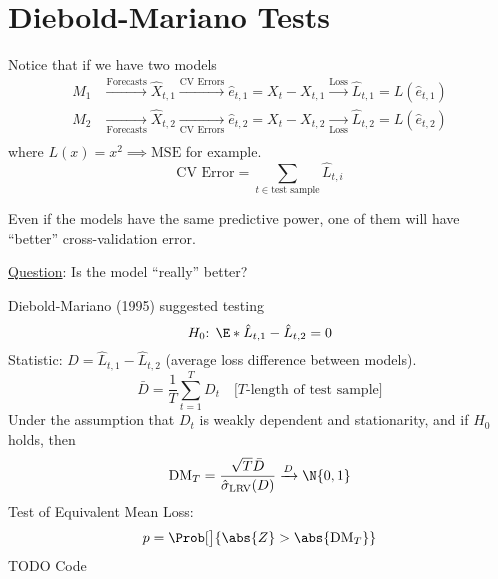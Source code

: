 \section{Diebold-Mariano Tests}
Notice that if we have two models
\begin{align*}
    M_1 & \xrightarrow{\text{Forecasts}} \hat{X}_{t,1} \xrightarrow{\text{CV Errors}} \hat{e}_{t,1}=X_t-X_{t,1} \xrightarrow{\text{Loss}} \hat{L}_{t,1}=L(\hat{e}_{t,1})     \\
    M_2 & \xrightarrow[\text{Forecasts}]{}\hat{X}_{t,2}\xrightarrow[\text{CV Errors}]{} \hat{e}_{t,2}=X_t-X_{t,2} \xrightarrow[\text{Loss}]{} \hat{L}_{t,2}=L(\hat{e}_{t,2}) \\
\end{align*}
where $ L(x)=x^2 \implies \text{MSE} $ for example.
\[ \text{CV Error}=\sum_{t\in\text{test sample}}\hat{L}_{t,i}  \]
\begin{Remark}{}{}
    Even if the models have the same predictive power, one of them will have ``better''
    cross-validation error.

    \underline{Question}: Is the model ``really'' better?
\end{Remark}
Diebold-Mariano (1995) suggested testing
\[ \text{$H_0$: }\E*{\hat{L}_{t,1}-\hat{L}_{t,2}}=0 \]
Statistic: $ D=\hat{L}_{t,1}-\hat{L}_{t,2} $ (average loss difference between models).
\[ \bar{D}=\frac{1}{T} \sum_{t=1}^{T} D_t\quad\text{[$T$-length of test sample]} \]
Under the assumption that $ D_t $ is weakly dependent and stationarity, and if $ H_0 $
holds, then
\[ \text{DM}_T=\frac{\sqrt{T}\bar{D}}{\hat{\sigma}_{\text{LRV}}(D)}\xrightarrow{D}\N{0,1}  \]
Test of Equivalent Mean Loss:
\[ p=\Prob[\big]{\abs{Z}>\abs{\text{DM}_T}} \]
TODO Code
